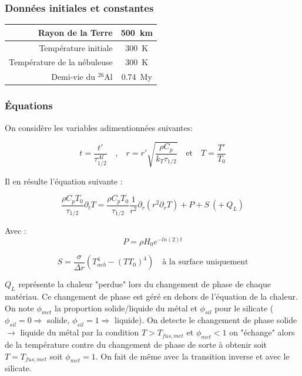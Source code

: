 \documentclass[10pt,a4paper]{article}
\numberwithin{equation}{section}
\begin{document}
\subsubsection{Données initiales et constantes}

\begin{center}
  \begin{tabu}{ r  c }
    \hline
    Rayon de la Terre & \SI{500}{km} \\ \hline
    Température initiale & \SI{300}{K}  \\ \hline
    Température de la nébuleuse & \SI{300}{K}  \\ \hline
    Demi-vie du $^{26}$Al & \SI{0.74}{My}  \\ \hline
  \end{tabu}
\end{center}

\subsubsection{Équations}

On considère les variables adimentionnées suivantes: 


\begin{equation}
t= \frac{t'}{\tau^{Al}_{1/2}}  \quad \textrm{,} \quad   r = r' \sqrt{\frac{\rho C_p} {k_T \tau_{1/2}}} \quad  \textrm{et} \quad T = \frac{T'}{T_0} 
\end{equation}

Il en résulte l'équation suivante :


\begin{equation}
\frac{\rho C_p T_0}{\tau_{1/2}} \partial_{t} T = \frac{\rho C_p T_0}{\tau_{1/2}} \frac{1}{r^2} \partial_{r} ( {r}^2 \partial_{r} T)  + P + S ~(+ ~Q_L)
\end{equation}


Avec :
\begin{equation}
 P = \rho H_0 e^{-ln(2) t} 
\end{equation}

\begin{equation}
 S =\frac{\sigma}{\Delta r}(T_{neb}^4 - (TT_0)^4)  \quad \textrm{à la surface uniquement}
\end{equation}

$Q_L$ représente la chaleur "perdue" lors du changement de phase de chaque matériau. Ce changement de phase est géré en dehors de l'équation de la chaleur. On note $\phi_{met}$ la proportion solide/liquide du métal et $\phi_{sil}$ pour le silicate ($\phi_{sil} = 0 \Rightarrow$ solide, $\phi_{sil} = 1 \Rightarrow$ liquide). On detecte le changement de phase solide $\rightarrow$ liquide du métal par la condition  $T > T_{fus,met} $ et $ \phi_{met} < 1$ on "échange" alors de la température contre du changement de phase de sorte à obtenir soit $T = T_{fus,met}$ soit $\phi_{met} = 1$. On fait de même avec la transition inverse et avec le silicate.
\end{document}
